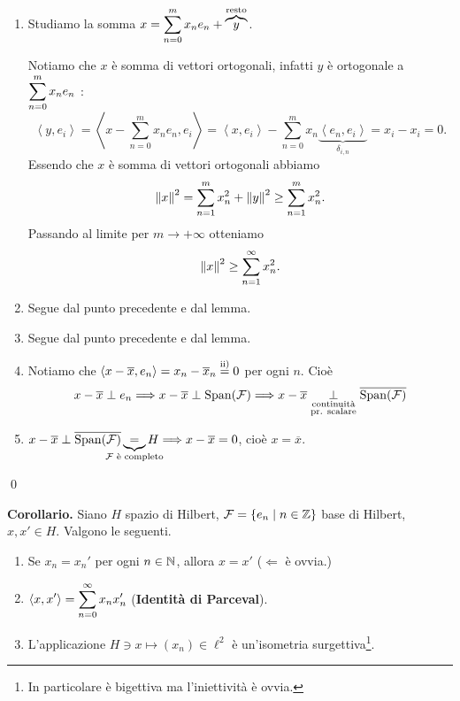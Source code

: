 \begin{enumerate}
\item Studiamo la somma $\displaystyle x = \sum_{n=0}^{m} x_n e_n + \overbrace{y}^{\text{resto}}$.

Notiamo che $x$ è somma di vettori ortogonali, infatti $y$ è ortogonale a $\displaystyle \sum_{n=0}^{m} x_n e_n$ :
%
$$
\left<y,e_i \right> = \left<x - \sum_{n=0}^{m} x_n e_n, e_i \right>
= \left<x,e_i \right> - \sum_{n=0}^{m} x_n \underbrace{\left<e_n,e_i \right>}_{\delta_{i,n}} = x_i - x_i = 0.
$$
%
Essendo che $x$ è somma di vettori ortogonali abbiamo
%
$$
\left\lVert x \right\rVert^2 = \sum_{n=1}^{m} x_n^2 + \left\lVert y \right\rVert^2 \geq \sum_{n=1}^{m} x_n^2.
$$
%
Passando al limite per $m \to +\infty$ otteniamo
%
$$
\left\lVert x \right\rVert^2 \geq \sum_{n=1}^{\infty} x_n^2. 
$$
%

\item Segue dal punto precedente e dal lemma.

\item Segue dal punto precedente e dal lemma.

\item Notiamo che $\left<x - \overline{x}, e_n \right> = x_n - \overline{x}_n \overset{\text{ii)}}{=} 0$ per ogni $n$. Cioè
%
$$
x - \overline{x} \perp e_n \Longrightarrow x - \overline{x} \perp \operatorname{Span}(\mathcal{F})
\Longrightarrow x - \overline{x} \underset{\substack{\text{continuità} \\ \text{pr. scalare}}}{\perp} \overline{\operatorname{Span}(\mathcal{F})}
$$
%

\item $x - \overline{x} \perp \overline{\spn(\mc{F})} \underbrace{=}_{\mathclap{\text{$\mc{F}$ è completo}}} H \Longrightarrow x - \overline{x} = 0$, cioè $x = \overline{x}$.
\end{enumerate}
\qed

\textbf{Corollario.} Siano $H$ spazio di Hilbert, $\mathcal{F} = \left\{ e_n \;\middle|\; n \in \mathbb Z \right\}$ base di Hilbert, $x,x' \in H$. Valgono le seguenti.
\begin{enumerate}
\item Se $x_n = x_n'$ per ogni $n \in \mathbb N$, allora $x = x'$ ($\Leftarrow$ è ovvia.)

\item $\displaystyle \left<x,x' \right> = \sum_{n=0}^{\infty} x_n  x_n'$ (\textbf{Identità di Parceval}).

\item L'applicazione $H \ni x \mapsto (x_n) \in \ell^2$ è un'isometria surgettiva\footnote{In particolare è bigettiva ma l'iniettività è ovvia.}.
\end{enumerate}

